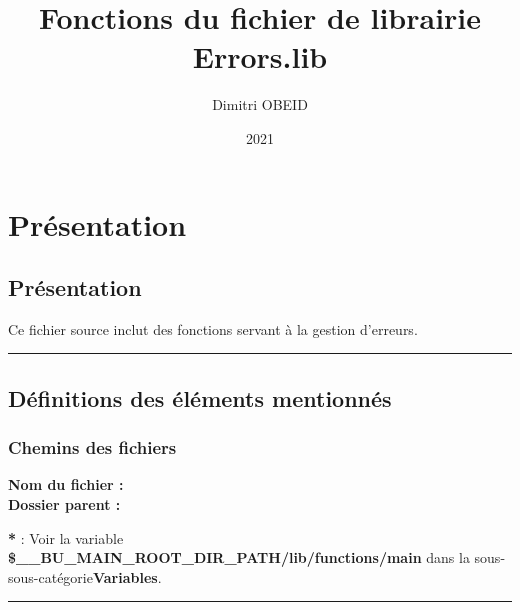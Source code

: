 \documentclass[a4paper,10pt]{article}
\title{\color{red}Fonctions du fichier de librairie \color{lime}Errors.lib}\color{white}
\author{Dimitri OBEID}
\date{2021}
\begin{document}
 \maketitle
 \tableofcontents
 \newpage

\color{red}
\section{Présentation}\color{white}

\color{green}
\subsection{Présentation}\color{white}

\begin{justify}
    Ce fichier source inclut des fonctions servant à la gestion d'erreurs.
\end{justify}




\color{green}\par\noindent\rule{\textwidth}{0.4pt}\color{white}

\color{green}
\subsection{Définitions des éléments mentionnés}\color{white}

\color{blue}
\subsubsection{Chemins des fichiers}\color{white}

\textbf{Nom du fichier : \color{lime}}\\[1\baselineskip]

\textbf{Dossier parent : \color{lime}}\\[1\baselineskip]

\begin{justify}
    \textbf{*} : Voir la variable \textbf{\color{orange}\$\_\_BU\_MAIN\_ROOT\_DIR\_PATH/lib/functions/main} dans la sous-sous-catégorie\linebreak \textbf{\color{blue}Variables}.
\end{justify}


\color{lime}\par\noindent\rule{\textwidth}{0.4pt}\color{white}\\[1\baselineskip]
\end{document}
